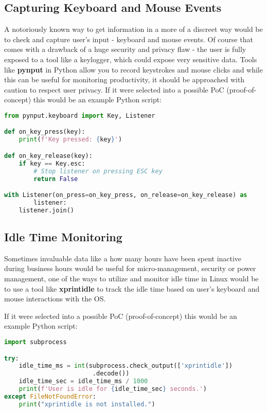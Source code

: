 \documentclass{VUMIFPSmagistrinis}
\begin{document}
\subsection{Capturing Keyboard and Mouse Events}
A notoriously known way to get information in a more of a discreet way would be to check and capture user's input - keyboard and mouse events. Of course that comes with a drawback of a huge security and privacy flaw - the user is fully exposed to a tool like a keylogger, which could expose very sensitive data. Tools like \textbf{pynput} in Python allow you to record keystrokes and mouse clicks and while this can be useful for monitoring productivity, it should be approached with caution to respect user privacy. If it were selected into a possible PoC (proof-of-concept) this would be an example Python script:
\begin{lstlisting}[language=Python]
from pynput.keyboard import Key, Listener

def on_key_press(key):
    print(f'Key pressed: {key}')

def on_key_release(key):
    if key == Key.esc:
        # Stop listener on pressing ESC key
        return False

with Listener(on_press=on_key_press, on_release=on_key_release) as 
        listener:
    listener.join()
\end{lstlisting}

\subsection{Idle Time Monitoring}
Sometimes invaluable data like a how many hours have been spent inactive during business hours would be useful for micro-management, security or power management, one of the ways to utilize and monitor idle time in Linux would be to use a tool like \textbf{xprintidle} to track the idle time based on user's keyboard and mouse interactions with the OS.

If it were selected into a possible PoC (proof-of-concept) this would be an example Python script:
\begin{lstlisting}[language=Python]
import subprocess

try:
    idle_time_ms = int(subprocess.check_output(['xprintidle'])
                        .decode())
    idle_time_sec = idle_time_ms / 1000
    print(f'User is idle for {idle_time_sec} seconds.')
except FileNotFoundError:
    print("xprintidle is not installed.")
\end{lstlisting}
\end{document}
